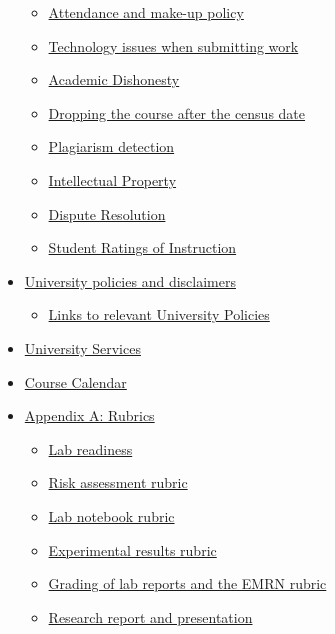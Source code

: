\begin{itemize}
  \begin{itemize}
  \tightlist
  \item
    \hyperref[attendance-and-make-up-policy]{Attendance and make-up
    policy}
  \item
    \hyperref[technology-issues-when-submitting-work]{Technology issues
    when submitting work}
  \item
    \hyperref[academic-dishonesty]{Academic Dishonesty}
  \item
    \hyperref[dropping-the-course-after-the-census-date]{Dropping the
    course after the census date}
  \item
    \hyperref[plagiarism-detection]{Plagiarism detection}
  \item
    \hyperref[intellectual-property]{Intellectual Property}
  \item
    \hyperref[dispute-resolution]{Dispute Resolution}
  \item
    \hyperref[student-ratings-of-instruction]{Student Ratings of
    Instruction}
  \end{itemize}
\item
  \hyperref[university-policies-and-disclaimers]{University policies and
  disclaimers}

  \begin{itemize}
  \tightlist
  \item
    \hyperref[links-to-relevant-university-policies]{Links to relevant
    University Policies}
  \end{itemize}
\item
  \hyperref[university-services]{University Services}
\item
  \hyperref[course-calendar]{Course Calendar}
\item
  \hyperref[appendix-a-rubrics]{Appendix A: Rubrics}

  \begin{itemize}
  \tightlist
  \item
    \hyperref[lab-readiness]{Lab readiness}
  \item
    \hyperref[risk-assessment-rubric]{Risk assessment rubric}
  \item
    \hyperref[lab-notebook-rubric]{Lab notebook rubric}
  \item
    \hyperref[experimental-results-rubric]{Experimental results rubric}
  \item
    \hyperref[grading-of-lab-reports-and-the-emrn-rubric]{Grading of lab
    reports and the EMRN rubric}
  \item
    \hyperref[research-report-and-presentation]{Research report and
    presentation}
  \end{itemize}
\end{itemize}

